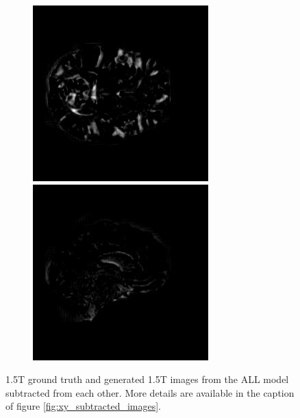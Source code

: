 \documentclass[12pt, fleqn, titlepage]{article}
\newcommand\skipperer{0.45pt}
\newcommand{\1}[1]{\mathds{1}\left[#1\right]}
\begin{document}
\begin{figure}[H]
\begin{subfigure}[b]{0.8\textwidth}
		\hskip\skipperer
		\includegraphics[width=0.22\linewidth]{imgs/subtracted_images/all/136_S_0196_xz_1.5_1.5gen_comparison}
		\hskip\skipperer
		\includegraphics[width=0.22\linewidth]{imgs/subtracted_images/all/136_S_0196_yz_1.5_1.5gen_comparison}
	\end{subfigure}
	\caption{1.5T ground truth and generated 1.5T images from the ALL model subtracted from each other. More details are available in the caption of figure \ref{fig:xy_subtracted_images}.}
	\label{fig:all_subtracted_images}
\end{figure}
\end{document}
